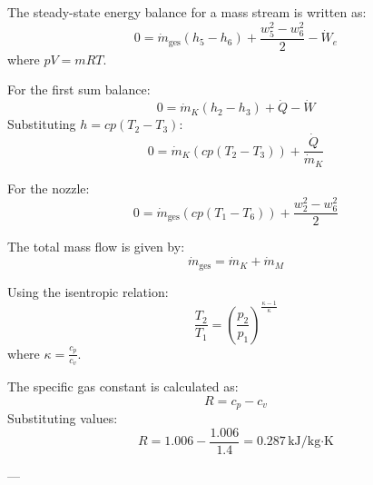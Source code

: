 The steady-state energy balance for a mass stream is written as:  
\[
0 = \dot{m}_{\text{ges}} \left( h_5 - h_6 \right) + \frac{w_5^2 - w_6^2}{2} - \dot{W}_e
\]  
where \( pV = mRT \).  

For the first sum balance:  
\[
0 = \dot{m}_K \left( h_2 - h_3 \right) + \dot{Q} - \dot{W}
\]  
Substituting \( h = cp(T_2 - T_3) \):  
\[
0 = \dot{m}_K \left( cp(T_2 - T_3) \right) + \frac{\dot{Q}}{\dot{m}_K}
\]  

For the nozzle:  
\[
0 = \dot{m}_{\text{ges}} \left( cp(T_1 - T_6) \right) + \frac{w_2^2 - w_6^2}{2}
\]  

The total mass flow is given by:  
\[
\dot{m}_{\text{ges}} = \dot{m}_K + \dot{m}_M
\]  

Using the isentropic relation:  
\[
\frac{T_2}{T_1} = \left( \frac{p_2}{p_1} \right)^{\frac{\kappa - 1}{\kappa}}
\]  
where \( \kappa = \frac{c_p}{c_v} \).  

The specific gas constant is calculated as:  
\[
R = c_p - c_v
\]  
Substituting values:  
\[
R = 1.006 - \frac{1.006}{1.4} = 0.287 \, \text{kJ/kg·K}
\]  

---